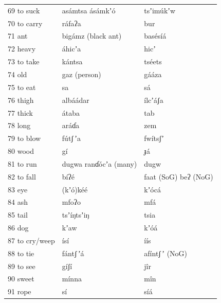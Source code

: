 \documentclass[output=paper]{langsci/langscibook}
\begin{document}
\begin{longtable}{p{}  p{} p{}}
69 to suck & asámtsa   ásámkʼ\'{o} & tsʼim\'{u}kʼw \\

70 to carry & ráfaʔa & bur \\

71 ant & bigámz    (black ant) & basésíá \\

72 heavy & áhicʼa & hicʼ \\

73 to take & kántsa & tséets \\

74 old & gaz   (person) & gááza \\

75 to eat & sa & sá \\

76 thigh & albáádar & ílcʼáʃa \\

77 thick & átaba & tab \\

78 long & aráɗa & zem \\

79 to blow & f\'{u}tʃ\,ʼa & fwítsʃʼ \\

80 wood & gí & ɟá \\

81 to run & dugwa     ranɗ\'{o}cʼa   (many) & dugw \\

82 to fall & bíʔé & faat (SoG)   beʔ (NoG) \\

83 eye & (kʼ\'{o})kéé & kʼ\'{o}cá \\

84 ash & mfoʔo & mfá \\

85 tail & tsʼíŋtsʼiŋ & tsia \\

86 dog & kʼaw & kʼ\'{o}á \\

87 to cry/weep & ísí & íís \\

88 to tie & fántʃ\,ʼá & afíntʃ\,ʼ (NoG) \\

89 to see & gíʃí & j\^{i}r \\

90 sweet & mínna & m\^{i}n \\

91 rope & sí & síá \\


\end{longtable}
\end{document}
